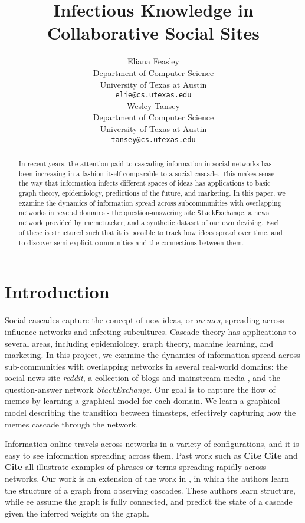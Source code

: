 \documentclass{article} %
\title{Infectious Knowledge in Collaborative Social Sites}
\author{
Eliana Feasley\\
Department of Computer Science\\
University of Texas at Austin\\
\texttt{elie@cs.utexas.edu} \\
\And
Wesley Tansey\\
Department of Computer Science\\
University of Texas at Austin\\
\texttt{tansey@cs.utexas.edu} \\
}
\def\c{\textbf{ Cite }}
\begin{document}
\maketitle

\begin{abstract}
In recent years, the attention paid to cascading information in social networks has been increasing in a fashion itself comparable to a social cascade. This makes sense - the way that information infects different spaces of ideas has applications to basic graph theory, epidemiology, predictions of the future, and marketing. In this paper, we examine the dynamics of information spread across subcommunities with overlapping networks in several domains - the question-answering site \texttt{StackExchange}, a news network provided by memetracker, and a synthetic dataset of our own devising. Each of these is structured such that it is possible to track how ideas spread over time, and to discover semi-explicit communities and the connections between them.
\end{abstract}

\section{Introduction}
\label{intro}
Social cascades capture the concept of new ideas, or \textit{memes}, spreading across influence networks and infecting subcultures. Cascade theory has applications to several areas, including epidemiology, graph theory, machine learning, and marketing. In this project, we examine the dynamics of information spread across sub-communities with overlapping networks in several real-world domains: the social news site \textit{reddit}, a collection of blogs and mainstream media \cite{memetracker}, and the question-answer network \textit{StackExchange}. Our goal is to capture the flow of memes by learning a graphical model for each domain. We learn a graphical model describing the transition between timesteps, effectively capturing how the memes cascade through the network.

Information online travels across networks in a variety of configurations, and it is easy to see information spreading across them. Past work such as \c \c and \c all illustrate examples of phrases or terms spreading rapidly across networks.
Our work is an extension of the work in \cite{netinf}, in which the authors learn the structure of a graph from observing cascades. These authors learn structure, while ee assume the graph is fully connected, and predict the state of a cascade given the inferred weights on the graph. 
\end{document}
